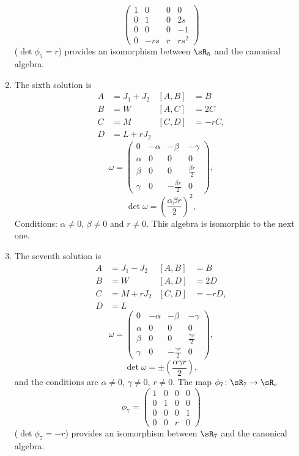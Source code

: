 \begin{enumerate}
\begin{equation}
\begin{pmatrix}
1&0&0&0\\
0&1&0&2s\\
0&0&0&-1\\
0&-rs&r&rs^{2}
\end{pmatrix}
\end{equation}
($\det\phi_{5}=r$) provides an isomorphism between $\sR_{5}$ and the canonical algebra.
\item The sixth solution is
\begin{align*}
A&=J_{1}+J_{2}      &[A,B]&=B\\
B&=W            &[A,C]&=2C\\
C&=M            &[C,D]&=-rC,\\
D&=L+rJ_{2}
\end{align*}
\begin{equation}
\omega=\begin{pmatrix}
0   &-\alpha        &-\beta &-\gamma\\
\alpha  &0          &0  &0\\
\beta   &0          &0  &\frac{ \beta r }{2}\\
\gamma  &0          &-\frac{ \beta r }{2}   &0
\end{pmatrix},
\end{equation}
\begin{equation}
\det\omega=\left( \frac{ \alpha\beta r }{ 2 } \right)^2,
\end{equation}
Conditions: $\alpha\neq 0$, $\beta\neq 0$ and $r\neq 0$. This algebra is isomorphic to the next one.
\item The seventh solution is
\begin{align*}
A&=J_{1}-J_{2}      &[A,B]&=B\\
B&=W            &[A,D]&=2D\\
C&=M+rJ_{2}     &[C,D]&=-rD,\\
D&=L
\end{align*}
\begin{equation}
\omega=\begin{pmatrix}
0   &-\alpha        &-\beta &-\gamma\\
\alpha  &0          &0  &0\\
\beta   &0          &0  &\frac{ \gamma r }{2}\\
\gamma  &0          &-\frac{ \gamma r }{2}  &0
\end{pmatrix},
\end{equation}
\begin{equation}
\det\omega=\pm\left( \frac{ \alpha\gamma r }{ 2 } \right),
\end{equation}
and the conditions are $\alpha\neq 0$, $\gamma\neq 0$, $r\neq 0$.  The map $\phi_7\colon \sR_7\to \sR_c$
\[
  \phi_{7}=
\begin{pmatrix}
1&0&0&0\\
0&1&0&0\\
0&0&0&1\\
0&0&r&0
\end{pmatrix}
\]
($\det\phi_{7}=-r$) provides an isomorphism between $\sR_{7}$ and the canonical algebra.
\end{enumerate}
